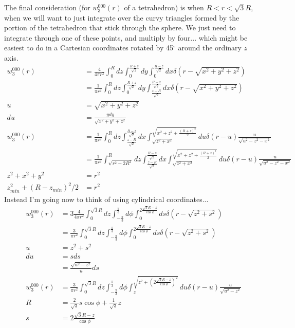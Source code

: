 \documentclass[letterpaper,twocolumn,amsmath,amssymb,pre]{revtex4-1}
\begin{document}
The final consideration (for $w_3^{000}(r)$ of a tetrahedron) is when
$R < r < \sqrt{3}R$, when we will want to just integrate over the
curvy triangles formed by the portion of the tetrahedron that stick
through the sphere.  We just need to integrate through one of these
points, and multiply by four... which might be easiest to do in a
Cartesian coordinates rotated by 45$^\circ$ around the ordinary $z$
axis.
\begin{align}
  w_3^{000}(r)
  &=
  \frac4{4\pi r^2}
  \int_{0}^R dz
  \int_0^{\frac{R+z}{\sqrt{2}}} dy
  \int_0^{\frac{R-z}{\sqrt{2}}} dx
  \delta(r-\sqrt{x^2+y^2+z^2})
  \\
  &=
  \frac1{\pi r^2}
  \int_{0}^R dz
  \int_0^{\frac{R+z}{\sqrt{2}}} dy
  \int_{\frac{z-R}{\sqrt{2}}}^{\frac{R-z}{\sqrt{2}}} dx
  \delta(r-\sqrt{x^2+y^2+z^2})
  \\
  u&= \sqrt{x^2+y^2+z^2}\\
  du &= \frac{ydy}{\sqrt{x^2+y^2+z^2}}
  \\
  w_3^{000}(r)
  &=
  \frac1{\pi r^2}
  \int_{0}^R dz
  \int_{\frac{z-R}{\sqrt{2}}}^{\frac{R-z}{\sqrt{2}}} dx
  \int_{\sqrt{z^2+x^2}}^{\sqrt{x^2+z^2+\frac{(R+z)^2}{2}}} du
  \delta(r-u)\frac{u}{\sqrt{u^2-z^2-x^2}}
  \\
  &=
  \frac1{\pi r^2}
  \int_{\sqrt{r^2-2R^2}}^R dz
  \int_{\frac{z-R}{\sqrt{2}}}^{\frac{R-z}{\sqrt{2}}} dx
  \int_{\sqrt{z^2+x^2}}^{\sqrt{x^2+z^2+\frac{(R+z)^2}{2}}} du
  \delta(r-u)\frac{u}{\sqrt{u^2-z^2-x^2}}
  \\
  z^2+x^2+y^2 &= r^2 \\
  z_{min}^2 + (R-z_{min})^2/2 &= r^2
\end{align}
Instead I'm going now to think of using cylindrical coordinates...
\begin{align}
  w_3^{000}(r) &= 3\frac{4}{4\pi r^2}
  \int_0^{\sqrt{3}R}dz\int_{-\frac{\pi}{3}}^{\frac{\pi}{3}}d\phi\int_0^{2\frac{\sqrt{3}R-z}{\cos\phi}} ds
  \delta(r-\sqrt{z^2+s^2})
  \\
  &= \frac{3}{\pi r^2}
  \int_0^{\sqrt{3}R}dz\int_{-\frac{\pi}{3}}^{\frac{\pi}{3}}d\phi\int_0^{2\frac{\sqrt{3}R-z}{\cos\phi}} ds
  \delta(r-\sqrt{z^2+s^2})
  \\
  u &= z^2+s^2 \\
  du &= sds \\
  &= \frac{\sqrt{u^2-z^2}}{u}ds
  \\
  w_3^{000}(r)
  &= \frac{3}{\pi r^2}
  \int_0^{\sqrt{3}R}dz\int_{-\frac{\pi}{3}}^{\frac{\pi}{3}}d\phi\int_{z}^{\sqrt{z^2+\left(2\frac{\sqrt{3}R-z}{\cos\phi}\right)^2}} du
  \delta(r-u)\frac{u}{\sqrt{u^2-z^2}}
  \\
  R &= \frac{2}{\sqrt{3}}s\cos\phi + \frac{1}{\sqrt{3}}z \\
  s &= 2\frac{\sqrt{3}R-z}{\cos\phi}
\end{align}
\end{document}
